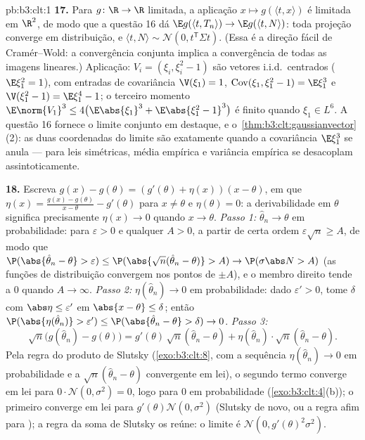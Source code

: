 \begin{solution}{pb:b3:clt:1}
\textbf{17.} Para $g \colon \R \to \R$  limitada,
a aplicação $x \mapsto g(\langle t, x\rangle)$ é 
limitada em $\R^2$, de modo que a questão 16 dá $\E g(\langle
t, T_n\rangle) \to \E g(\langle t, N\rangle)$: toda
projeção converge em distribuição, e $\langle t,
N\rangle \sim \mathcal N(0, t^{\mathsf T}\Sigma t)$. (Essa
é a direção fácil de Cramér--Wold: a convergência conjunta
implica a convergência de todas as imagens lineares.) Aplicação:
$V_i = (\xi_i, \xi_i^2 - 1)$ são vetores i.i.d.\ centrados
($\E\xi_1^2 = 1$), com entradas de covariância $\V(\xi_1) =
1$, $\operatorname{Cov}(\xi_1, \xi_1^2 - 1) = \E\xi_1^3$
e $\V(\xi_1^2 - 1) = \E\xi_1^4 - 1$; o terceiro momento
$\E\norm{V_1}^3 \leq 4\bigl(\E\abs{\xi_1}^3 +
\E\abs{\xi_1^2 - 1}^3\bigr)$ é finito quando $\xi_1 \in
L^6$. A questão 16 fornece o limite  conjunto
em destaque, e o~\cref{thm:b3:clt:gaussianvector}(2): as duas
coordenadas do limite são  exatamente quando a
covariância $\E\xi_1^3$ se anula --- para leis simétricas,
média empírica e variância empírica se desacoplam
assintoticamente.

\textbf{18.} Escreva $g(x) - g(\theta) = (g'(\theta) +
\eta(x))(x - \theta)$, em que $\eta(x) = \frac{g(x) -
g(\theta)}{x - \theta} - g'(\theta)$ para $x \neq \theta$
e $\eta(\theta) = 0$: a derivabilidade em $\theta$
significa precisamente $\eta(x) \to 0$ quando $x \to \theta$.
\emph{Passo 1:} $\hat\theta_n \to \theta$ em probabilidade:
para $\varepsilon > 0$ e qualquer $A > 0$, a partir de certa ordem
$\varepsilon\sqrt n \geq A$, de modo que $\P(\abs{\hat\theta_n -
\theta} > \varepsilon) \leq \P(\abs{\sqrt
n(\hat\theta_n - \theta)} > A) \to \P(\sigma\abs N > A)$
(as funções de distribuição convergem nos pontos de 
$\pm A$), e o membro direito tende a $0$ quando $A \to
\infty$. \emph{Passo 2:} $\eta(\hat\theta_n) \to 0$ em
probabilidade: dado $\varepsilon' > 0$, tome $\delta$ com
$\abs\eta \leq \varepsilon'$ em $\abs{x - \theta} \leq
\delta$; então $\P(\abs{\eta(\hat\theta_n)} > \varepsilon')
\leq \P(\abs{\hat\theta_n - \theta} > \delta) \to 0$.
\emph{Passo 3:}
\[
\sqrt n\bigl(g(\hat\theta_n) - g(\theta)\bigr) =
g'(\theta)\,\sqrt n(\hat\theta_n - \theta) +
\eta(\hat\theta_n)\cdot\sqrt n(\hat\theta_n - \theta) .
\]
Pela regra do produto de Slutsky (\cref{exo:b3:clt:8}, com a
sequência $\eta(\hat\theta_n) \to 0$ em probabilidade e a
$\sqrt n(\hat\theta_n - \theta)$ convergente em lei), o
segundo termo converge em lei para $0\cdot\mathcal N(0,
\sigma^2) = 0$, logo para $0$ em probabilidade
(\cref{exo:b3:clt:4}(b)); o primeiro converge em lei para
$g'(\theta)\mathcal N(0, \sigma^2)$ (Slutsky de novo, ou a
regra afim para ); a regra da soma
de Slutsky os reúne: o limite é $\mathcal N(0,
g'(\theta)^2\sigma^2)$.


\end{solution}
